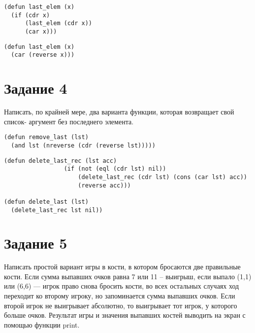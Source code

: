 \begin{lstlisting}
(defun last_elem (x)
  (if (cdr x)
      (last_elem (cdr x))
      (car x)))
\end{lstlisting}

\begin{lstlisting}
(defun last_elem (x)
  (car (reverse x)))
\end{lstlisting}

\section{Задание 4}
Написать, по крайней мере, два варианта функции, которая возвращает свой список-
аргумент без последнего элемента.

\begin{lstlisting}
(defun remove_last (lst)
  (and lst (nreverse (cdr (reverse lst)))))
\end{lstlisting}

\begin{lstlisting}
(defun delete_last_rec (lst acc)
                 (if (not (eql (cdr lst) nil))
                     (delete_last_rec (cdr lst) (cons (car lst) acc))
                     (reverse acc)))

(defun delete_last (lst)
  (delete_last_rec lst nil))
\end{lstlisting}

\section{Задание 5}
Написать простой вариант игры в кости, в котором бросаются две правильные кости. Если
сумма выпавших очков равна 7 или 11 -- выигрыш, если выпало (1,1) или (6,6) --- игрок право
снова бросить кости, во всех остальных случаях ход переходит ко второму игроку, но
запоминается сумма выпавших очков. Если второй игрок не выигрывает абсолютно, то
выигрывает тот игрок, у которого больше очков. Результат игры и значения выпавших костей
выводить на экран с помощью функции print.

